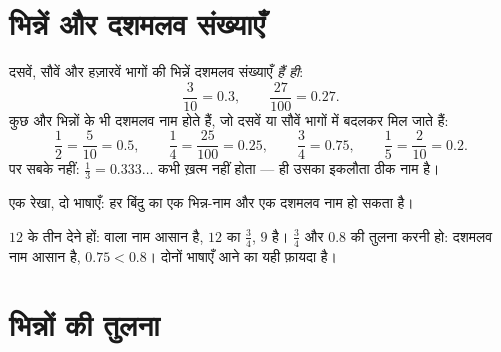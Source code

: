 \section{भिन्नें और दशमलव संख्याएँ}

\begin{proposition}[दशमलव नाम वाली भिन्नें]\label{prop:g5:fractions:decimal}
दसवें, सौवें और हज़ारवें भागों की भिन्नें दशमलव संख्याएँ
\emph{हैं ही}:
\[
\frac{3}{10} = 0.3, \qquad \frac{27}{100} = 0.27 .
\]
कुछ और भिन्नों के भी दशमलव नाम होते हैं, जो दसवें या सौवें भागों
में बदलकर मिल जाते हैं:
\[
\frac{1}{2} = \frac{5}{10} = 0.5, \qquad
\frac{1}{4} = \frac{25}{100} = 0.25, \qquad
\frac{3}{4} = 0.75, \qquad
\frac{1}{5} = \frac{2}{10} = 0.2 .
\]
पर सबके नहीं: $\frac13 = 0.333\dots$ कभी ख़त्म नहीं होता ---
 ही उसका इकलौता ठीक नाम है।
\end{proposition}
\admitted

\begin{omfigure}

{\small एक रेखा, दो भाषाएँ: हर बिंदु का एक भिन्न-नाम और एक
दशमलव नाम हो सकता है।}
\end{omfigure}

\begin{example}[जो नाम आसान पड़े, वही चुनो]\label{ex:g5:fractions:choose}
$12$ के तीन  देने हों:  वाला नाम आसान है, $12$ का
$\frac34$, $9$ है। $\frac34$ और $0.8$ की तुलना करनी हो: दशमलव नाम
आसान है, $0.75 < 0.8$। दोनों भाषाएँ आने का यही फ़ायदा है।
\end{example}

\section{भिन्नों की तुलना}

